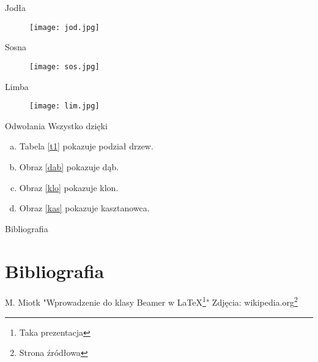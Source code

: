 \documentclass{beamer}
\begin{document}
\begin{frame}{Jodła}
\begin{figure}[h!]
\texttt{[image: jod.jpg]}
\end{figure}
\end{frame}

\begin{frame}{Sosna}
\begin{figure}[h!]
\texttt{[image: sos.jpg]}
\end{figure}
\end{frame}

\begin{frame}{Limba}
\begin{figure}[h!]
\texttt{[image: lim.jpg]}
\end{figure}
\end{frame}

\begin{frame}{Odwołania}
Wszystko dzięki \cite{Miotk}
\begin{enumerate}[a)]
\item Tabela \ref{t1} pokazuje podział drzew.
\pause
\item Obraz \ref{dab} pokazuje dąb.
\pause
\item Obraz  \ref{klo} pokazuje klon.
\pause
\item Obraz \ref{kas} pokazuje kasztanowca.
\end{enumerate}
\end{frame}

\begin{frame}{Bibliografia}
\section{Bibliografia}\label{bb}
\begin{thebibliography}{2}
M. Miotk "Wprowadzenie do klasy Beamer w \LaTeX \footnote[1]{Taka prezentacja}"
Zdjęcia: wikipedia.org\footnote[2]{Strona źródłowa}
\end{thebibliography}
\end{frame}
\end{document}
